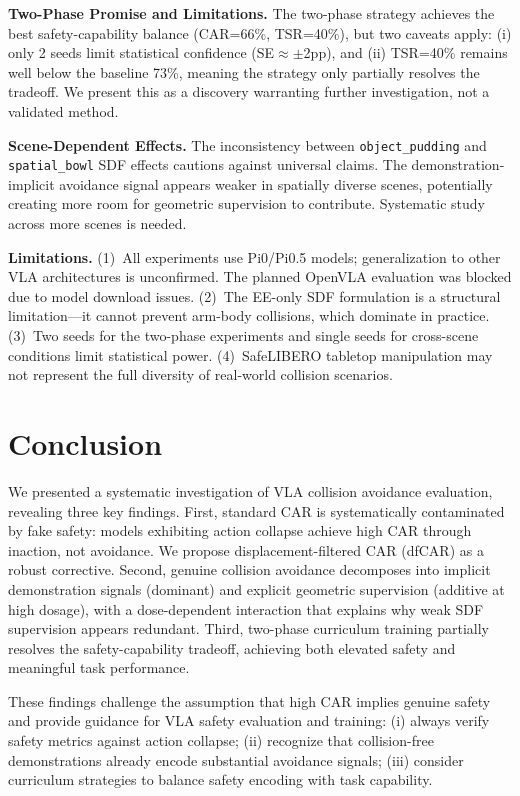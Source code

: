 \documentclass[letterpaper]{article}
\begin{document}
\textbf{Two-Phase Promise and Limitations.} The two-phase strategy achieves the best safety-capability balance (CAR=66\%, TSR=40\%), but two caveats apply: (i) only 2 seeds limit statistical confidence (SE$\approx \pm$2pp), and (ii) TSR=40\% remains well below the baseline 73\%, meaning the strategy only partially resolves the tradeoff. We present this as a discovery warranting further investigation, not a validated method.

\textbf{Scene-Dependent Effects.} The inconsistency between \texttt{object\_pudding} and \texttt{spatial\_bowl} SDF effects cautions against universal claims. The demonstration-implicit avoidance signal appears weaker in spatially diverse scenes, potentially creating more room for geometric supervision to contribute. Systematic study across more scenes is needed.

\textbf{Limitations.} (1)~All experiments use Pi0/Pi0.5 models; generalization to other VLA architectures is unconfirmed. The planned OpenVLA evaluation was blocked due to model download issues. (2)~The EE-only SDF formulation is a structural limitation---it cannot prevent arm-body collisions, which dominate in practice. (3)~Two seeds for the two-phase experiments and single seeds for cross-scene conditions limit statistical power. (4)~SafeLIBERO tabletop manipulation may not represent the full diversity of real-world collision scenarios.


\section{Conclusion}

We presented a systematic investigation of VLA collision avoidance evaluation, revealing three key findings. First, standard CAR is systematically contaminated by fake safety: models exhibiting action collapse achieve high CAR through inaction, not avoidance. We propose displacement-filtered CAR (dfCAR) as a robust corrective. Second, genuine collision avoidance decomposes into implicit demonstration signals (dominant) and explicit geometric supervision (additive at high dosage), with a dose-dependent interaction that explains why weak SDF supervision appears redundant. Third, two-phase curriculum training partially resolves the safety-capability tradeoff, achieving both elevated safety and meaningful task performance.

These findings challenge the assumption that high CAR implies genuine safety and provide guidance for VLA safety evaluation and training: (i) always verify safety metrics against action collapse; (ii) recognize that collision-free demonstrations already encode substantial avoidance signals; (iii) consider curriculum strategies to balance safety encoding with task capability.



\end{document}
